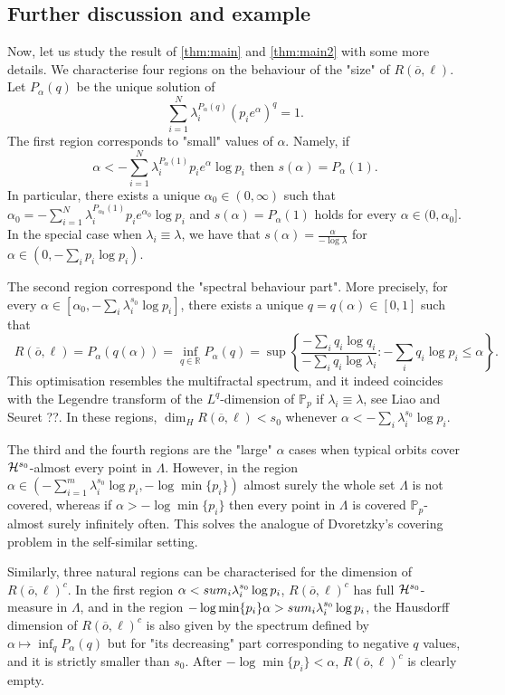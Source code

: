 \documentclass[12pt,]{article}
\theoremstyle{definition}
\theoremstyle{remark}
\renewcommand{\Bbb}[1]{\mathbb{#1}}
\newcommand{\bbP}{{\Bbb P}}
\newcommand{\bbR}{{\Bbb R}}        %
\newcommand{\cH}{{\cal H}}
\newcommand{\0}{\mathbf{0}}
\newcommand{\bo}{{\overline o}}
\DeclareMathOperator{\dimh}{\dim_H}
\begin{document}
\subsection{Further discussion and example}\label{sec:discuss}

Now, let us study the result of \cref{thm:main} and \cref{thm:main2} with some more details. We
characterise four regions on the behaviour of the "size" of $R(\bo,\ell)$. Let $P_\alpha(q)$ be the
unique solution of
$$
\sum_{i=1}^N \lambda_i^{P_{\alpha}(q)}(p_ie^\alpha)^q=1.
$$
The first region corresponds to "small" values of $\alpha$. Namely, if
$$
\alpha<-\sum_{i=1}^N\lambda_i^{P_\alpha(1)}p_ie^\alpha \log p_i\text{ then }s(\alpha)=P_\alpha(1).
$$
In particular, there exists a unique $\alpha_0\in(0,\infty)$ such that
$\alpha_0=-\sum_{i=1}^N\lambda_i^{P_{\alpha_0}(1)}p_ie^{\alpha_0} \log p_i$ and
$s(\alpha)=P_\alpha(1)$ holds for every $\alpha\in(0,\alpha_0]$. In the special case when
$\lambda_i\equiv\lambda$, we have that $s(\alpha)=\frac{\alpha}{-\log\lambda}$ for
$\alpha\in(0,-\sum_ip_i\log p_i)$.

The second region correspond the "spectral behaviour part". More precisely, for every
$\alpha\in[\alpha_0,-\sum_i\lambda_i^{s_0}\log p_i]$, there exists a unique $q=q(\alpha)\in[0,1]$
such that
$$
\dimh R(\bo,\ell)=P_{\alpha}(q(\alpha))=\inf_{q\in\bbR}P_\alpha(q)=\sup\left\{\frac{-\sum_iq_i\log
q_i}{-\sum_iq_i\log\lambda_i}:-\sum_iq_i\log p_i\leq\alpha\right\}.
$$ This optimisation resembles the multifractal spectrum, and it indeed coincides with the Legendre
transform of the $L^q$-dimension of $\bbP_p$ if $\lambda_i\equiv\lambda$, see Liao and Seuret ??. In
these regions, $\dim_HR(\bo,\ell)<s_0$ whenever $\alpha<-\sum_i\lambda_i^{s_0}\log p_i$.

The third and the fourth regions are the "large" $\alpha$ cases when typical orbits cover
$\cH^{s_0}$-almost every point in $\Lambda$. However, in the region $\alpha\in(- \sum_{i=1}^m
\lambda_i^{s_0}\log  p_i,-\log\min\{p_i\})$ almost surely the whole set $\Lambda$ is not covered,
whereas if $\alpha>-\log\min\{p_i\}$ then every point in $\Lambda$ is covered $\bbP_p$-almost surely
infinitely often. This solves the analogue of Dvoretzky's covering problem in the self-similar
setting.

Similarly, three natural regions can be characterised for the dimension of $R(\bo,\ell)^c$. In the
first region $\alpha<\-sum_i\lambda_i^{s_0}\log p_i$, $R(\bo,\ell)^c$ has full $\cH^{s_0}$-measure
in $\Lambda$, and in the region $-\log\min\{p_i\}\alpha>\-sum_i\lambda_i^{s_0}\log p_i$, the
Hausdorff dimension of $R(\bo,\ell)^c$ is also given by the spectrum defined by
$\alpha\mapsto\inf_qP_\alpha(q)$ but for "its decreasing" part corresponding to negative $q$ values,
and it is strictly smaller than $s_0$. After $-\log\min\{p_i\}<\alpha$, $R(\bo,\ell)^c$ is clearly
empty.
\end{document}

